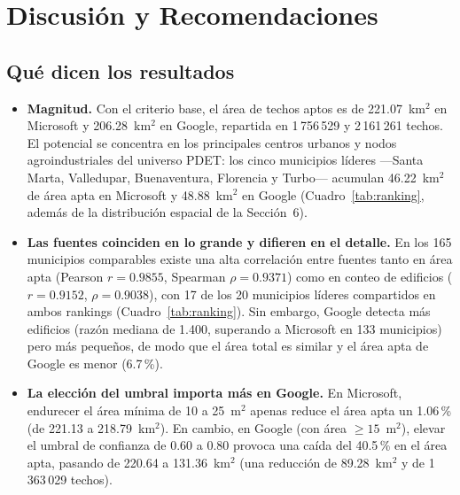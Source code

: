 \section{Discusión y Recomendaciones}\label{sec:discusion}

\subsection{Qué dicen los resultados}
\begin{itemize}
  \item \textbf{Magnitud.} Con el criterio base, el área de techos aptos es de 221.07~km$^2$ en Microsoft y 206.28~km$^2$ en Google, repartida en 1\,756\,529 y 2\,161\,261 techos. El potencial se concentra en los principales centros urbanos y nodos agroindustriales del universo PDET: los cinco municipios líderes ---Santa Marta, Valledupar, Buenaventura, Florencia y Turbo--- acumulan 46.22~km$^2$ de área apta en Microsoft y 48.88~km$^2$ en Google (Cuadro~\ref{tab:ranking}, además de la distribución espacial de la Sección~6).
  \item \textbf{Las fuentes coinciden en lo grande y difieren en el detalle.} En los 165 municipios comparables existe una alta correlación entre fuentes tanto en área apta (Pearson $r = 0.9855$, Spearman $\rho = 0.9371$) como en conteo de edificios ($r = 0.9152$, $\rho = 0.9038$), con 17 de los 20 municipios líderes compartidos en ambos rankings (Cuadro~\ref{tab:ranking}). Sin embargo, Google detecta más edificios (razón mediana de 1.400, superando a Microsoft en 133 municipios) pero más pequeños, de modo que el área total es similar y el área apta de Google es menor (6.7\,\%).
  \item \textbf{La elección del umbral importa más en Google.} En Microsoft, endurecer el área mínima de 10 a 25~m$^2$ apenas reduce el área apta un 1.06\,\% (de 221.13 a 218.79~km$^2$). En cambio, en Google (con área $\geq 15$~m$^2$), elevar el umbral de confianza de 0.60 a 0.80 provoca una caída del 40.5\,\% en el área apta, pasando de 220.64 a 131.36~km$^2$ (una reducción de 89.28~km$^2$ y de 1\,363\,029 techos).
\end{itemize}

